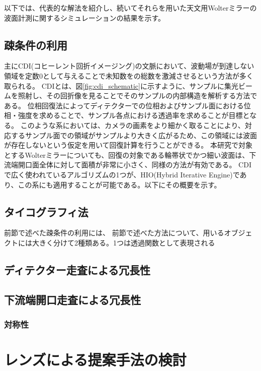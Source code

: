 \documentclass[dvipdfmx,autodetect-engine]{jreport}
\begin{document}
以下では、代表的な解法を紹介し、続いてそれらを用いた天文用Wolterミラーの波面計測に関するシミュレーションの結果を示す。

\section{疎条件の利用}
主にCDI(コヒーレント回折イメージング)の文脈において、波動場が到達しない領域を定数0として与えることで未知数をの総数を激減させるという方法が多く取られる。
CDIとは、図\ref{fig:cdi_schematic}に示すように、サンプルに集光ビームを照射し、その回折像を見ることでそのサンプルの内部構造を解析する方法である。
位相回復法によってディテクターでの位相およびサンプル面における位相・強度を求めることで、サンプル各点における透過率を求めることが目標となる。
このような系においては、カメラの画素をより細かく取ることにより、対応するサンプル面での領域がサンプルより大きく広がるため、この領域には波面が存在しないという仮定を用いて回復計算を行うことができる。
本研究で対象とするWolterミラーについても、回復の対象である輪帯状でかつ細い波面は、下流端開口面全体に対して面積が非常に小さく、同様の方法が有効である。
CDIで広く使われているアルゴリズムの1つが、HIO(Hybrid Iterative Engine)であり、この系にも適用することが可能である。以下にその概要を示す。

\section{タイコグラフィ法}
前節で述べた疎条件の利用には、
前節で述べた方法について、用いるオブジェクトには大きく分けて2種類ある。1つは透過関数として表現される


\section{ディテクター走査による冗長性}

\section{下流端開口走査による冗長性}

\subsection{対称性}

\newpage
\chapter{レンズによる提案手法の検討}
\minitoc
\end{document}
